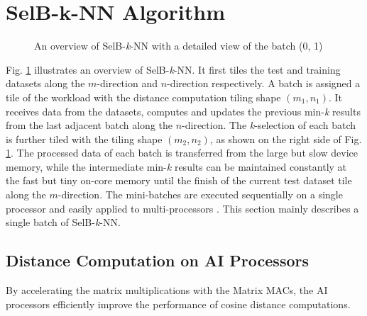 \section{SelB-k-NN Algorithm}

\begin{figure}[t]
    \caption{An overview of SelB-\textit{k}-NN with a detailed view of the batch (0, 1)}
    \label{fig:tiling}
    \end{figure}

Fig. \ref{fig:tiling} illustrates an overview of SelB-\textit{k}-NN. It first tiles the test and training datasets along the $m$-direction and $n$-direction respectively. A batch is assigned a tile of the workload with the distance computation tiling shape $(m_1, n_1)$. It receives data from the datasets, computes and updates the previous min-\textit{k} results from the last adjacent batch along the $n$-direction. The \textit{k}-selection of each batch is further tiled with the tiling shape $(m_2, n_2)$, as shown on the right side of Fig. \ref{fig:tiling}. The processed data of each batch is transferred from the large but slow device memory, while the intermediate min-\textit{k} results can be maintained constantly at the fast but tiny on-core memory until the finish of the current test dataset tile along the $m$-direction. The mini-batches are executed sequentially on a single processor and easily applied to multi-processors \cite{van2007superlinear}. This section mainly describes a single batch of SelB-\textit{k}-NN.

\subsection{Distance Computation on AI Processors}

By accelerating the matrix multiplications with the Matrix MACs, the AI processors efficiently improve the performance of cosine distance computations. 

